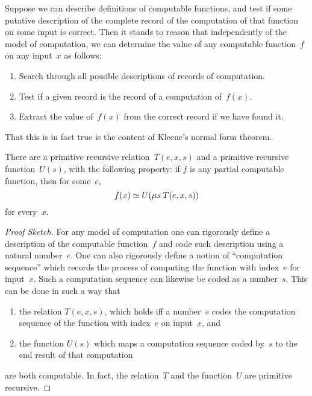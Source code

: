 \documentclass[../../../include/open-logic-section]{subfiles}
\begin{document}

Suppose we can describe definitions of computable functions, and test if
some putative description of the complete record of the computation of
that function on some input is correct. Then it stands to reason that
independently of the model of computation, we can determine the value
of any computable function~$f$ on any input~$x$ as follows:
\begin{enumerate}
  \item Search through all possible descriptions of records of
  computation.
  \item Test if a given record is the record of a computation of~$f(x)$.
  \item Extract the value of~$f(x)$ from the correct record if we have
  found it.
\end{enumerate}
That this is in fact true is the content of Kleene's normal form
theorem.

\begin{thm}
There are a primitive recursive relation~$T(e, x, s)$ and a primitive
recursive function~$U(s)$, with the following property: if $f$ is any
partial computable function, then for some~$e$,
\[
f(x) \simeq U(\mu s \; T(e, x, s))
\]
for every~$x$.
\end{thm}

\begin{proof}[Proof Sketch]
For any model of computation one can rigorously define a description
of the computable function~$f$ and code such description using a
natural number~$e$.  One can also rigorously define a notion of
``computation sequence'' which records the process of computing the
function with index~$e$ for input~$x$.  Such a computation sequence can
likewise be coded as a number~$s$.  This can be done in such a way
that
\begin{enumerate}
  \item the relation $T(e, x, s)$, which holds iff a number~$s$ codes the computation
  sequence of the function with index~$e$ on input~$x$, and
  \item the function $U(s)$ which maps a computation sequence coded
  by~$s$ to the end result of that computation
\end{enumerate}
are both computable. In fact, the relation~$T$ and the function~$U$
are primitive recursive.
\end{proof}
\end{document}
